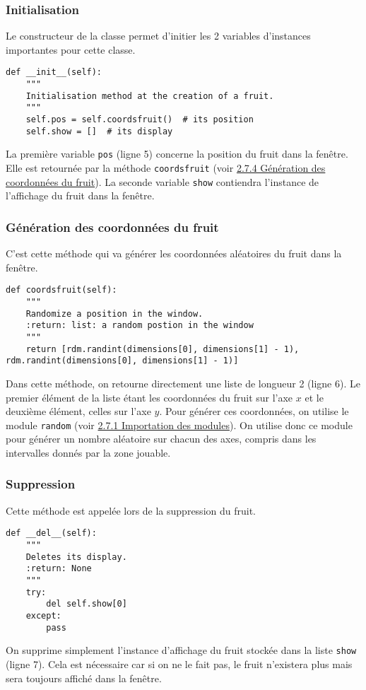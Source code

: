 \documentclass[12pt, a4paper, openany]{book}
\begin{document}
\subsubsection{Initialisation}
Le constructeur de la classe permet d'initier les 2 variables d'instances importantes pour cette classe.
\begin{verbatim}
def __init__(self):
    """
    Initialisation method at the creation of a fruit.
    """
    self.pos = self.coordsfruit()  # its position
    self.show = []  # its display
\end{verbatim}
La première variable \verb'pos' (ligne 5) concerne la position du fruit dans la fenêtre. Elle est retournée par la méthode \verb'coordsfruit' (voir \hyperref[r:2.7.4-coo]{2.7.4 Génération des coordonnées du fruit}). La seconde variable \verb'show' contiendra l'instance de l'affichage du fruit dans la fenêtre.

\subsubsection{Génération des coordonnées du fruit}
\label{r:2.7.4-coo}
C'est cette méthode qui va générer les coordonnées aléatoires du fruit dans la fenêtre.
\begin{verbatim}
def coordsfruit(self):
    """
    Randomize a position in the window.
    :return: list: a random postion in the window
    """
    return [rdm.randint(dimensions[0], dimensions[1] - 1), rdm.randint(dimensions[0], dimensions[1] - 1)]
\end{verbatim}
Dans cette méthode, on retourne directement une liste de longueur 2 (ligne 6). Le premier élément de la liste étant les coordonnées du fruit sur l'axe $x$ et le deuxième élément, celles sur l'axe $y$. Pour générer ces coordonnées, on utilise le module \verb'random' (voir \hyperref[r:2.7.1-imp]{2.7.1 Importation des modules}). On utilise donc ce module pour générer un nombre aléatoire sur chacun des axes, compris dans les intervalles donnés par la zone jouable.

\subsubsection{Suppression}
Cette méthode est appelée lors de la suppression du fruit.
\begin{verbatim}
def __del__(self):
    """
    Deletes its display.
    :return: None
    """
    try:
        del self.show[0]
    except:
        pass
\end{verbatim}
On supprime simplement l'instance d'affichage du fruit stockée dans la liste \verb'show' (ligne 7). Cela est nécessaire car si on ne le fait pas, le fruit n'existera plus mais sera toujours affiché dans la fenêtre.
\end{document}
